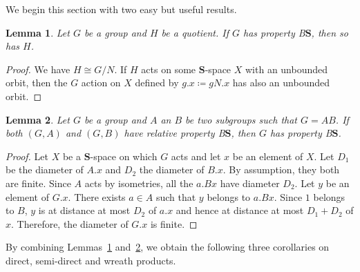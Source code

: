 \documentclass[a4paper]{article}
\newcounter{mycomment}
\newcommand{\mycomment}[2][]{\refstepcounter{mycomment}{\todo[color={green!33},size=\small]{\textbf{Commentaire [\uppercase{#1}\themycomment]:}~#2}}}
\newcommand{\PH}[1]{\todo[color={blue!33},size=small]{#1}}
\newcommand{\GS}[1]{\mycomment[GS]{#1}}
\newtheorem{lem}{Lemma}[section]
\theoremstyle{definition}
\newcommand*{\BS}{B$\mathbf{S}$}
\begin{document}
We begin this section with two easy but useful results.
%
%
\begin{lem}\label{Lemma:Quotient}
Let $G$ be a group and $H$ be a quotient.
If $G$ has property \BS, then so has $H$.
\end{lem}
\begin{proof}
We have $H\cong G/N$. If $H$ acts on some $\mathbf{S}$-space $X$ with an unbounded orbit, then the $G$ action on $X$ defined by $g.x\coloneqq gN.x$ has also an unbounded orbit.
\end{proof}
%
%
\begin{lem}\label{Lemma:InterProd}
Let $G$ be a group and $A$ an $B$ be two subgroups such that $G=AB$.
If both $(G,A)$ and $(G,B)$ have relative property \BS, then $G$ has property \BS.
\end{lem}
\begin{proof}
Let $X$ be a $\mathbf{S}$-space on which $G$ acts and let $x$ be an element of $X$.
Let $D_1$ be the diameter of $A.x$ and $D_2$ the diameter of $B.x$. By assumption, they both are finite.
Since $A$ acts by isometries, all the $a.Bx$ have diameter $D_2$.
Let $y$ be an element of $G.x$. There exists $a\in A$ such that $y$ belongs to $a.Bx$. Since $1$ belongs to $B$, $y$ is at distance at most $D_2$ of $a.x$ and hence at distance at most $D_1+D_2$ of $x$.
Therefore, the diameter of $G.x$ is finite.
\end{proof}
%
%
%
By combining Lemmas~\ref{Lemma:Quotient} and~\ref{Lemma:InterProd}, we obtain the following three corollaries on direct, semi-direct and wreath products.%
\end{document}
